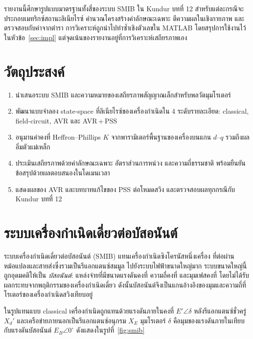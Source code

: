 \documentclass[12pt,a4paper]{article}
\begin{document}
รายงานนี้ศึกษารูปแบบมาตรฐานทั้งสี่ของระบบ SMIB ใน Kundur บทที่ 12
สำหรับแต่ละกรณีจะประกอบเมทริกซ์สถานะลิเนียไรซ์ คำนวณโครงสร้างค่าลักษณะเฉพาะ
ตีความผลในเชิงกายภาพ และตรวจสอบกับค่าจากตำรา
การวิเคราะห์ถูกนำไปทำซ้ำเชิงตัวเลขใน MATLAB โดยสรุปการใช้งานไว้ในหัวข้อ~\ref{sec:impl}
แต่จุดเน้นของรายงานอยู่ที่การวิเคราะห์เสถียรภาพเอง

\section{วัตถุประสงค์}

\begin{enumerate}
    \item นำเสนอระบบ SMIB และความหมายของเสถียรภาพสัญญาณเล็กสำหรับพลวัตมุมโรเตอร์
    \item พัฒนาแบบจำลอง state-space ที่ลิเนียไรซ์ของเครื่องกำเนิดใน 4 ระดับรายละเอียด:
          classical, field-circuit, AVR และ AVR\,+\,PSS
    \item อนุมานค่าคงที่ Heffron--Phillips $K$ จากพารามิเตอร์พื้นฐานของเครื่องบนแกน
          $d$--$q$ รวมถึงผลอิ่มตัวแม่เหล็ก
    \item ประเมินเสถียรภาพด้วยค่าลักษณะเฉพาะ อัตราส่วนการหน่วง และความถี่ธรรมชาติ
          พร้อมยืนยันข้อสรุปด้วยผลตอบสนองในโดเมนเวลา
    \item แสดงผลของ AVR และบทบาทแก้ไขของ PSS ต่อโหมดสวิง
          และตรวจสอบผลทุกกรณีกับ Kundur บทที่ 12
\end{enumerate}

\section{ระบบเครื่องกำเนิดเดี่ยวต่อบัสอนันต์}
\label{sec:smib}

ระบบเครื่องกำเนิดเดี่ยวต่อบัสอนันต์ (SMIB) แทนเครื่องกำเนิดซิงโครนัสหนึ่งเครื่อง
ที่ต่อผ่านหม้อแปลงและสายส่งซึ่งรวมเป็นรีแอกแตนซ์สมมูล ไปยังระบบไฟฟ้าขนาดใหญ่มาก
ระบบขนาดใหญ่นี้ถูกอุดมคติให้เป็น \emph{บัสอนันต์}: แหล่งจ่ายที่มีขนาดแรงดันคงที่
ความถี่คงที่ และมุมเฟสคงที่ โดยไม่ได้รับผลกระทบจากพฤติกรรมของเครื่องกำเนิดเดี่ยว
ดังนั้นบัสอนันต์จึงเป็นแกนอ้างอิงของมุมและความถี่ที่โรเตอร์ของเครื่องกำเนิดสวิงเทียบอยู่

ในรูปแทนแบบ classical เครื่องกำเนิดถูกแทนด้วยแรงดันภายในคงที่
$E'\angle\delta$ หลังรีแอกแตนซ์ชั่วครู่ $X_d'$ และเครือข่ายภายนอกเป็นรีแอกแตนซ์อนุกรม $X_E$
มุมโรเตอร์ $\delta$ คือมุมของแรงดันภายในเทียบกับแรงดันบัสอนันต์ $E_B\angle 0^\circ$
ดังแสดงในรูปที่~\ref{fig:smib}
\end{document}
